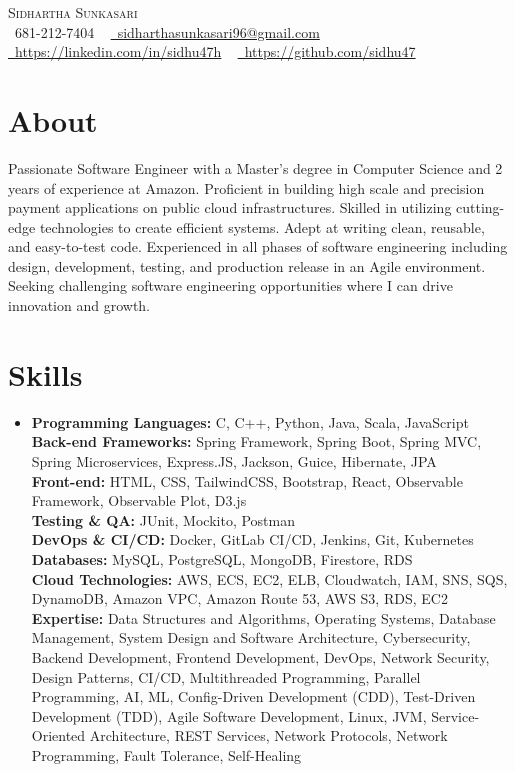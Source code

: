 \documentclass[letterpaper,10.5pt]{article}
\begin{document}
\begin{center}
    {\Huge \scshape Sidhartha Sunkasari} \\
    \small \raisebox{-0.1\height}\faPhone\ 681-212-7404 ~ 
    \href{mailto:sidharthasunkasari96@gmail.com}{\raisebox{-0.2\height}\faEnvelope\ sidharthasunkasari96@gmail.com} ~
    \href{https://linkedin.com/in/sidhu47h}{\raisebox{-0.2\height}\faLinkedin\ https://linkedin.com/in/sidhu47h} ~
    \href{https://github.com/sidhu47}{\raisebox{-0.2\height}\faGithub\ https://github.com/sidhu47}
\end{center}

\section{About}
{\fontsize{10pt}{10pt}\selectfont
Passionate Software Engineer with a Master’s degree in Computer Science and 2 years of experience at Amazon. Proficient in building high scale and precision payment applications on public cloud infrastructures. Skilled in utilizing cutting-edge technologies to create efficient systems. Adept at writing clean, reusable, and easy-to-test code. Experienced in all phases of software engineering including design, development, testing, and production release in an Agile environment. Seeking challenging software engineering opportunities where I can drive innovation and growth.
}

\section{Skills}
\begin{itemize}[leftmargin=0.15in, label={}]
    \small\item{ 
\textbf{Programming Languages:} C, C++, Python, Java, Scala, JavaScript \\ \textbf{Back-end Frameworks:} Spring Framework, Spring Boot, Spring MVC, Spring Microservices, Express.JS, Jackson, Guice, Hibernate, JPA \\ \textbf{Front-end:} HTML, CSS, TailwindCSS, Bootstrap, React, Observable Framework, Observable Plot, D3.js \\ \textbf{Testing \& QA:} JUnit, Mockito, Postman \\ \textbf{DevOps \& CI/CD:} Docker, GitLab CI/CD, Jenkins, Git, Kubernetes \\ \textbf{Databases:} MySQL, PostgreSQL, MongoDB, Firestore, RDS \\ \textbf{Cloud Technologies:} AWS, ECS, EC2, ELB, Cloudwatch, IAM, SNS, SQS, DynamoDB, Amazon VPC, Amazon Route 53, AWS S3, RDS, EC2 \\ \textbf{Expertise:} Data Structures and Algorithms, Operating Systems, Database Management, System Design and Software Architecture, Cybersecurity, Backend Development, Frontend Development, DevOps, Network Security, Design Patterns, CI/CD, Multithreaded Programming, Parallel Programming, AI, ML, Config-Driven Development (CDD), Test-Driven Development (TDD), Agile Software Development, Linux, JVM, Service-Oriented Architecture, REST Services, Network Protocols, Network Programming, Fault Tolerance, Self-Healing }
\end{itemize}
\end{document}

